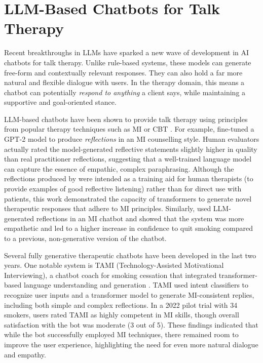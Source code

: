 \section{LLM-Based Chatbots for Talk Therapy}
Recent breakthroughs in LLMs have sparked a new wave of development in AI chatbots for talk therapy. Unlike rule-based systems, these models can generate free-form and contextually relevant responses. They can also hold a far more natural and flexible dialogue with users. In the therapy domain, this means a chatbot can potentially \textit{respond to anything} a client says, while maintaining a supportive and goal-oriented stance. 

LLM-based chatbots have been shown to provide talk therapy using principles from popular therapy techniques such as MI or CBT \cite{mahmood-etal-2025-fully,kian2024can,Ye2025}. For example, \citet{shen-etal-2020-counseling} fine-tuned a GPT-2 model to produce \emph{reflections} in an MI counselling style. Human evaluators actually rated the model-generated reflective statements slightly higher in quality than real practitioner reflections, suggesting that a well-trained language model can capture the essence of empathic, complex paraphrasing. Although the reflections produced by \citet{shen-etal-2020-counseling} were intended as a training aid for human therapists (to provide examples of good reflective listening) rather than for direct use with patients, this work demonstrated the capacity of transformers to generate novel therapeutic responses that adhere to MI principles. Similarly, \citet{brown2023mi} used LLM-generated reflections in an MI chatbot and showed that the system was more empathetic and led to a higher increase in confidence to quit smoking compared to a previous, non-generative version of the chatbot.


Several fully generative therapeutic chatbots have been developed in the last two years. One notable system is TAMI (Technology-Assisted Motivational Interviewing), a chatbot coach for smoking cessation that integrated transformer-based language understanding and generation \cite{SAIYED2022121}. TAMI used intent classifiers to recognize user inputs and a transformer model to generate MI-consistent replies, including both simple and complex reflections. In a 2022 pilot trial with 34 smokers, users rated TAMI as highly competent in MI skills, though overall satisfaction with the bot was moderate (3 out of 5). These findings indicated that while the bot successfully employed MI techniques, there remained room to improve the user experience, highlighting the need for even more natural dialogue and empathy.

